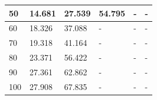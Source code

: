 \begin{table}[htp]
\begin{tabular}{|l|l|l|l|l|l|}
50                               & 14.681          & 27.539           & 54.795           & -                & -                \\ \hline
60                               & 18.326          & 37.088           & -                & -                & -                \\ \hline
70                               & 19.318          & 41.164           & -                & -                & -                \\ \hline
80                               & 23.371          & 56.422           & -                & -                & -                \\ \hline
90                               & 27.361          & 62.862           & -                & -                & -                \\ \hline
100                              & 27.908          & 67.835           & -                & -                & -                \\ \hline
\end{tabular}
\end{table}

